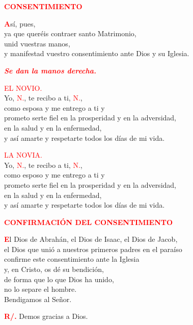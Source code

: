 \documentclass[12pt, letterpaper]{report}
\begin{document}
  \Large {\bfseries \textcolor{red}{CONSENTIMIENTO}}

  \lettrine[lines=2]{\bfseries \textcolor{red}{A}}{}\Large s\'i, pues, \\
  ya que quer\'eis contraer santo Matrimonio, \\
  unid vuestras manos, \\
  y manifestad vuestro consentimiento ante Dios y su Iglesia.

  {\bfseries \textcolor{red}{ \em Se dan la manos derecha.}}

  \clearpage
  
  \textcolor{red}{EL NOVIO.}\\
  Yo, \textcolor{red}{N.}, te recibo a ti, \textcolor{red}{N.}, \\
  como esposa y me entrego a ti y \\
  prometo serte fiel en la prosperidad y en la adversidad, \\
  en la salud y en la enfermedad, \\
  y as\'i amarte y respetarte todos los d\'ias de mi vida.

  \textcolor{red}{LA NOVIA.}\\
  Yo, \textcolor{red}{N.}, te recibo a ti, \textcolor{red}{N.}, \\
  como esposo y me entrego a ti y \\
  prometo serte fiel en la prosperidad y en la adversidad, \\
  en la salud y en la enfermedad, \\
  y as\'i amarte y respetarte todos los d\'ias de mi vida.

  \Large {\bfseries \textcolor{red}{CONFIRMACI\'ON DEL CONSENTIMIENTO}}

  \lettrine[lines=2]{\bfseries \textcolor{red}{E}}{}\Large l Dios de Abrah\'an, el Dios de Isaac, el Dios de Jacob, \\
  el Dios que uni\'o a nuestros primeros padres en el para\'iso \\
  confirme este consentimiento ante la Iglesia \\
  y, en Cristo, os d\'e su bendici\'on, \\
  de forma que lo que Dios ha unido, \\
  no lo separe el hombre.\\
  Bendigamos al Se\~nor.

  \Large \hspace{-0.9cm} {\bfseries \textcolor{red}{R/.}} \hspace{0.5cm} Demos gracias a Dios.
  
\end{document}
